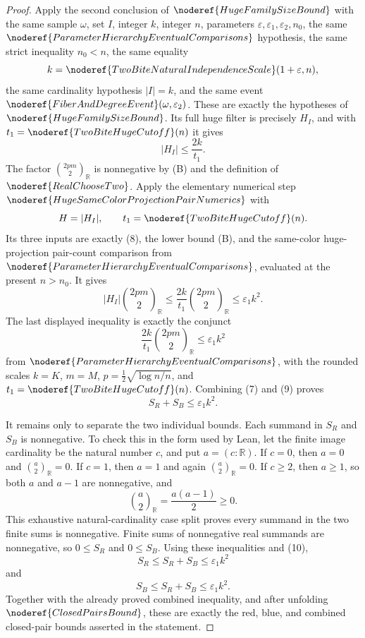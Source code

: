 \begin{proof}
Apply the second conclusion of \(\noderef{HugeFamilySizeBound}\) with the
same sample \(\omega\), set \(I\), integer \(k\), integer \(n\), parameters
\(\varepsilon,\varepsilon_1,\varepsilon_2,n_0\), the same
\(\noderef{ParameterHierarchyEventualComparisons}\) hypothesis, the same
strict inequality \(n_0<n\), the same equality
\[
k=\noderef{TwoBiteNaturalIndependenceScale}(1+\varepsilon,n),
\]
the same cardinality hypothesis \(|I|=k\), and the same event
\(\noderef{FiberAndDegreeEvent}(\omega,\varepsilon_2)\).  These are exactly
the hypotheses of \(\noderef{HugeFamilySizeBound}\).  Its full huge filter is
precisely \(H_I\), and with \(t_1=\noderef{TwoBiteHugeCutoff}(n)\) it gives
\[
|H_I|\le\frac{2k}{t_1}. \tag{8}
\]
The factor \(\binom{2pm}{2}_{\mathbb R}\) is nonnegative by (B) and the
definition of \(\noderef{RealChooseTwo}\).  Apply the elementary numerical
step \(\noderef{HugeSameColorProjectionPairNumerics}\) with
\[
H=|H_I|,\qquad t_1=\noderef{TwoBiteHugeCutoff}(n).
\]
Its three inputs are exactly (8), the lower bound (B), and the same-color
huge-projection pair-count comparison from
\(\noderef{ParameterHierarchyEventualComparisons}\), evaluated at the present
\(n>n_0\).  It gives
\[
|H_I|\binom{2pm}{2}_{\mathbb R}
\le
\frac{2k}{t_1}\binom{2pm}{2}_{\mathbb R}
\le\varepsilon_1k^2. \tag{9}
\]
The last displayed inequality is exactly the conjunct
\[
\frac{2k}{t_1}\binom{2pm}{2}_{\mathbb R}\le\varepsilon_1k^2
\]
from \(\noderef{ParameterHierarchyEventualComparisons}\), with the rounded
scales \(k=K\), \(m=M\), \(p=\frac12\sqrt{\log n/n}\), and
\(t_1=\noderef{TwoBiteHugeCutoff}(n)\).  Combining (7) and (9) proves
\[
S_R+S_B\le\varepsilon_1k^2. \tag{10}
\]

It remains only to separate the two individual bounds.  Each summand in
\(S_R\) and \(S_B\) is nonnegative.  To check this in the form used by Lean,
let the finite image cardinality be the natural number \(c\), and put
\(a=(c:\mathbb R)\).  If \(c=0\), then \(a=0\) and
\(\binom a2_{\mathbb R}=0\).  If \(c=1\), then \(a=1\) and again
\(\binom a2_{\mathbb R}=0\).  If \(c\ge2\), then \(a\ge1\), so both \(a\)
and \(a-1\) are nonnegative, and
\[
\binom a2_{\mathbb R}=\frac{a(a-1)}2\ge0.
\]
This exhaustive natural-cardinality case split proves every summand in the
two finite sums is nonnegative.  Finite sums of nonnegative real summands are
nonnegative, so \(0\le S_R\) and \(0\le S_B\).  Using these inequalities and
(10),
\[
S_R\le S_R+S_B\le\varepsilon_1k^2
\]
and
\[
S_B\le S_R+S_B\le\varepsilon_1k^2.
\]
Together with the already proved combined inequality, and after unfolding
\(\noderef{ClosedPairsBound}\), these are exactly the red, blue, and combined
closed-pair bounds asserted in the statement.
\end{proof}
